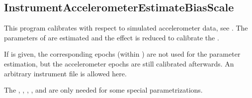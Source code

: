 \subsection{InstrumentAccelerometerEstimateBiasScale}\label{InstrumentAccelerometerEstimateBiasScale}
This program calibrates  with respect to
simulated accelerometer data, see .
The parameters 
of 
are estimated and the effect is reduced to calibrate the .

If  is given, the corresponding epochs
(within ) are not used for the parameter estimation,
but the accelerometer epochs are still calibrated afterwards.
An arbitrary instrument file is allowed here.

The , ,
, ,
and  are only needed for some special parametrizations.


